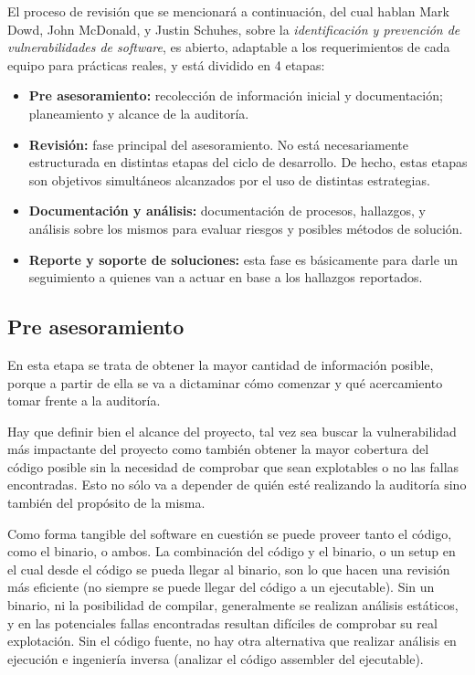 El proceso de revisión que se mencionará a continuación, del cual hablan Mark Dowd, John McDonald, y Justin Schuhes, sobre la \textit{identificación y prevención de vulnerabilidades de software}, es abierto, adaptable a los requerimientos de cada equipo para prácticas reales, y está dividido en 4 etapas:
\begin{itemize}
\item \textbf{Pre asesoramiento:} recolección de información inicial y documentación; planeamiento y alcance de la auditoría.
\item \textbf{Revisión:} fase principal del asesoramiento. No está necesariamente estructurada en distintas etapas del ciclo de desarrollo. De hecho, estas etapas son objetivos simultáneos alcanzados por el uso de distintas estrategias. 
\item \textbf{Documentación y análisis:} documentación de procesos, hallazgos, y análisis sobre los mismos para evaluar riesgos y posibles métodos de solución. 
\item \textbf{Reporte y soporte de soluciones:} esta fase es básicamente para darle un seguimiento a quienes van a actuar en base a los hallazgos reportados.
\end{itemize}

\subsection{Pre asesoramiento}
En esta etapa se trata de obtener la mayor cantidad de información posible, porque a partir de ella se va a dictaminar cómo comenzar y qué acercamiento tomar frente a la auditoría.

Hay que definir bien el alcance del proyecto, tal vez sea buscar la vulnerabilidad más impactante del proyecto como también obtener la mayor cobertura del código posible sin la necesidad de comprobar que sean explotables o no las fallas encontradas. Esto no sólo va a depender de quién esté realizando la auditoría sino también del propósito de la misma.

Como forma tangible del software en cuestión se puede proveer tanto el código, como el binario, o ambos. La combinación del código y el binario, o un setup en el cual desde el código se pueda llegar al binario, son lo que hacen una revisión más eficiente (no siempre se puede llegar del código a un ejecutable). Sin un binario, ni la posibilidad de compilar, generalmente se realizan análisis estáticos, y en las potenciales fallas encontradas resultan difíciles de comprobar su real explotación. Sin el código fuente, no hay otra alternativa que realizar análisis en ejecución e ingeniería inversa (analizar el código assembler del ejecutable).

